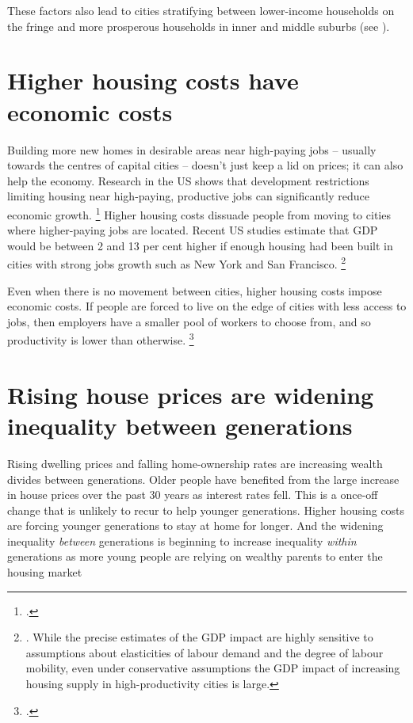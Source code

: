 These factors also lead to cities stratifying between lower-income households on the fringe and more prosperous households in inner and middle suburbs (see ).

\section{Higher housing costs have economic costs}\label{sec:higher-housing-costs-have-economic-costs}

Building more new homes in desirable areas near high-paying jobs -- usually towards the centres of capital cities -- doesn't just keep a lid on prices; it can also help the economy.
Research in the US shows that development restrictions limiting housing near high-paying, productive jobs can significantly reduce economic growth.%
    \footcites{GlaeserGyourko2017EconImplications}{NBER2017HsiehMoretti}{Parkhomenko2016}{Herkenhoff2017EmpireStates}{AndrewsEtAlHousing}
Higher housing costs dissuade people from moving to cities where higher-paying jobs are located.
Recent US studies estimate that GDP would be between 2 and 13 per cent higher if enough housing had been built in cities with strong jobs growth such as New York and San Francisco.%
    \footnote{\textcites[][22--24]{GlaeserGyourko2017EconImplications}{NBER2017HsiehMoretti}.
    While the precise estimates of the GDP impact are highly sensitive to assumptions about elasticities of labour demand and the degree of labour mobility, even under conservative assumptions the GDP impact of increasing housing supply in high-productivity cities is large.}

Even when there is no movement between cities, higher housing costs impose economic costs. If people are forced to live on the edge of cities with less access to jobs, then employers have a smaller pool of workers to choose from, and so productivity is lower than otherwise.%
	\footcite[][1]{Pawson-et-al-2015-Addressing}


\section{Rising house prices are widening inequality between generations}\label{sec:rising-house-prices-have-widened-inequality-both-across-and-within-generations}

Rising dwelling prices and falling home-ownership rates are increasing wealth divides between generations.
Older people have benefited from the large increase in house prices over the past 30 years as interest rates fell.
This is a once-off change that is unlikely to recur to help younger generations.
Higher housing costs are forcing younger generations to stay at home for longer.
And the widening inequality \emph{between} generations is beginning to increase inequality \emph{within} generations as more young people are relying on wealthy parents to enter the housing market



